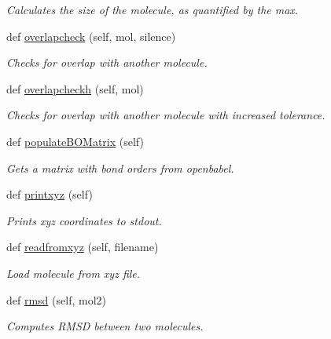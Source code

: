 \begin{DoxyCompactItemize}
\begin{DoxyCompactList}\small\item\em Calculates the size of the molecule, as quantified by the max. \end{DoxyCompactList}\item 
def \hyperlink{classmolSimplify_1_1Classes_1_1mol3D_1_1mol3D_aab1e703e70f941dfc764a47dfdd6a121}{overlapcheck} (self, mol, silence)
\begin{DoxyCompactList}\small\item\em Checks for overlap with another molecule. \end{DoxyCompactList}\item 
def \hyperlink{classmolSimplify_1_1Classes_1_1mol3D_1_1mol3D_a52aafa6742ea7f501a30b286bedfc4f4}{overlapcheckh} (self, mol)
\begin{DoxyCompactList}\small\item\em Checks for overlap with another molecule with increased tolerance. \end{DoxyCompactList}\item 
def \hyperlink{classmolSimplify_1_1Classes_1_1mol3D_1_1mol3D_a1566e9bd358aa20e095e4bb9d07d2174}{populate\+B\+O\+Matrix} (self)
\begin{DoxyCompactList}\small\item\em Gets a matrix with bond orders from openbabel. \end{DoxyCompactList}\item 
def \hyperlink{classmolSimplify_1_1Classes_1_1mol3D_1_1mol3D_ae6f619f46f387b2b609807fe06a6876a}{printxyz} (self)
\begin{DoxyCompactList}\small\item\em Prints xyz coordinates to stdout. \end{DoxyCompactList}\item 
def \hyperlink{classmolSimplify_1_1Classes_1_1mol3D_1_1mol3D_a693d0fb9d44650a500c91cac47e93a80}{readfromxyz} (self, filename)
\begin{DoxyCompactList}\small\item\em Load molecule from xyz file. \end{DoxyCompactList}\item 
def \hyperlink{classmolSimplify_1_1Classes_1_1mol3D_1_1mol3D_a970c3cdf7b4a051715a89e284d4227e6}{rmsd} (self, mol2)
\begin{DoxyCompactList}\small\item\em Computes R\+M\+SD between two molecules. \end{DoxyCompactList}\item 

\end{DoxyCompactItemize}
